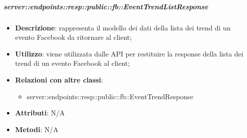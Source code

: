 
    \subparagraph{server::endpoints::resp::public::fb::EventTrendListResponse} %
    \label{subp:bdsm_app_server_endpoints_resp_public_fb_eventtrendlistresponse}
    \begin{itemize}
      \item \textbf{Descrizione}: rappresenta il modello dei dati della lista dei trend di un evento Facebook da ritornare al client;
      \item \textbf{Utilizzo}: viene utilizzata dalle API per restituire la response della lista dei trend di un evento Facebook al client;
      \item \textbf{Relazioni con altre classi}:
        \begin{itemize}
          \item server::endpoints::resp::public::fb::EventTrendResponse
        \end{itemize}
    \item \textbf{Attributi}: N/A
    \item \textbf{Metodi}: N/A
      \end{itemize}

